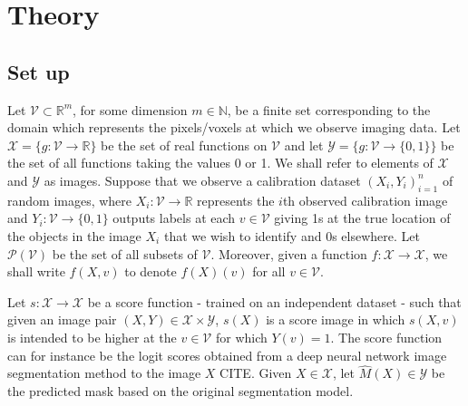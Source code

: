 \section{Theory}
\subsection{Set up}
Let $\mathcal{V} \subset \mathbb{R}^m$, for some dimension $m \in \mathbb{N}$, be a finite set corresponding to the domain which represents the pixels/voxels at which we observe imaging data. Let $\mathcal{X} = \lbrace g: \mathcal{V} \rightarrow \mathbb{R}\rbrace$ be the set of real functions on $\mathcal{V}$ and let $\mathcal{Y} = \lbrace g: \mathcal{V} \rightarrow \lbrace 0,1 \rbrace \rbrace$ be the set of all functions taking the values 0 or 1. We shall refer to elements of $\mathcal{X}$ and $\mathcal{Y}$ as images. Suppose that we observe a calibration dataset $(X_i, Y_i)_{i = 1}^n$ of random images, where $X_i: \mathcal{V} \rightarrow \mathbb{R}$ represents the $i$th observed calibration image and $Y_i:\mathcal{V} \rightarrow \lbrace 0, 1\rbrace$ outputs labels at each $v \in \mathcal{V}$ giving 1s at the true location of the objects in the image $X_i$ that we wish to identify and 0s elsewhere. Let $\mathcal{P}(\mathcal{V})$ be the set of all subsets of $\mathcal{V}$. Moreover, given a function $f:\mathcal{X} \rightarrow \mathcal{X}$, we shall write $f(X,v)$ to denote $f(X)(v)$ for all $v \in \mathcal{V}$. 

Let $s:\mathcal{X}  \rightarrow \mathcal{X} $ be a score function - trained on an independent dataset - such that given an image pair $(X,Y) \in \mathcal{X}\times \mathcal{Y}$, $s(X)$ is a score image in which $s(X,v) $ is intended to be higher at the $v \in \mathcal{V}$ for which $Y(v) = 1$. The score function can for instance be the logit scores obtained from a deep neural network image segmentation method to the image $X$ CITE. Given $X \in \mathcal{X}$, let $\hat{M}(X) \in \mathcal{Y}$ be the predicted mask based on the original segmentation model.


